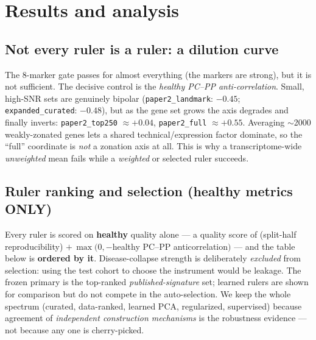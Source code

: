 \documentclass[11pt]{article}
\begin{document}
\section{Results and analysis}

\subsection{Not every ruler is a ruler: a dilution curve}
The 8-marker gate passes for almost everything (the markers are strong), but it is not sufficient.
The decisive control is the \emph{healthy PC--PP anti-correlation}. Small, high-SNR sets are
genuinely bipolar (\texttt{paper2\_landmark}: $-0.45$; \texttt{expanded\_curated}: $-0.48$), but as the gene set grows the axis
degrades and finally inverts: \texttt{paper2\_top250} $\approx +0.04$, \texttt{paper2\_full} $\approx +0.55$. Averaging
$\sim$2000 weakly-zonated genes lets a shared technical/expression factor dominate, so the
``full'' coordinate is \emph{not} a zonation axis at all. This is why a transcriptome-wide
\emph{unweighted} mean fails while a \emph{weighted} or selected ruler succeeds.

\subsection{Ruler ranking and selection (healthy metrics ONLY)}
Every ruler is scored on \textbf{healthy} quality alone --- a quality score of
(split-half reproducibility) $+\,\max(0,-$healthy PC--PP anticorrelation$)$ --- and the table below
is \textbf{ordered by it}. Disease-collapse strength is deliberately \emph{excluded} from selection:
using the test cohort to choose the instrument would be leakage. The frozen primary is the
top-ranked \emph{published-signature} set; learned rulers are shown for comparison but do not compete
in the auto-selection. We keep the whole spectrum (curated, data-ranked, learned PCA, regularized,
supervised) because agreement of \emph{independent construction mechanisms} is the robustness
evidence --- not because any one is cherry-picked.
\end{document}
